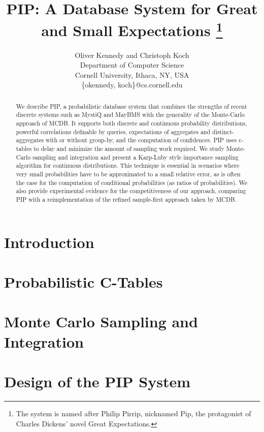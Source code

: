 \documentclass{vldb}
\title{PIP: A Database System for Great and Small Expectations%
\thanks{The
system is named after Philip Pirrip, nicknamed Pip, the protagonist of
Charles Dickens' novel Great Expectations.}}
\author{Oliver Kennedy and Christoph Koch\\
Department of Computer Science \\
Cornell University, Ithaca, NY, USA \\
\{okennedy, koch\}@cs.cornell.edu}
\date{}
\begin{document}


\maketitle



\begin{abstract}
We describe PIP, a probabilistic database system
that combines the strengths of
recent discrete systems such as MystiQ and MayBMS with the generality of
the Monte-Carlo approach of MCDB. It supports both discrete and
continuous probability distributions, powerful correlations definable
by queries, expectations of aggregates and distinct-aggregates with or
without  group-by,  and the computation of confidences.
%
PIP uses c-tables to delay and minimize the amount of sampling work required.
We study Monte-Carlo sampling and integration and
present a Karp-Luby style importance
sampling algorithm for continuous distributions.
This technique is essential
in scenarios where very small probabilities have to be approximated to a small
relative error, as is often the case for the computation of conditional
probabilities (as ratios of probabilities).
%
We also provide experimental evidence for the competitiveness
of our approach, comparing PIP with a reimplementation of the
refined sample-first approach taken by MCDB. 
\end{abstract}



\section{Introduction}
\label{sec:introduction}


\section{Probabilistic C-Tables}
\label{sec:background}


\section{Monte Carlo Sampling and Integration}
\label{sec:sampling}


\section{Design of the PIP System}
\label{sec:design}

\end{document}
